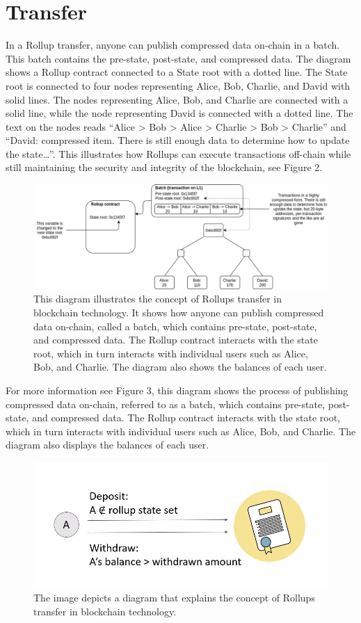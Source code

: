\documentclass{report}
\begin{document}
\section{Transfer}
In a Rollup transfer, anyone can publish compressed data on-chain in a batch. This batch contains the pre-state, post-state, and compressed data. The diagram shows a Rollup contract connected to a State root with a dotted line. The State root is connected to four nodes representing Alice, Bob, Charlie, and David with solid lines. The nodes representing Alice, Bob, and Charlie are connected with a solid line, while the node representing David is connected with a dotted line. The text on the nodes reads “Alice > Bob > Alice > Charlie > Bob > Charlie” and “David: compressed item. There is still enough data to determine how to update the state…”. This illustrates how Rollups can execute transactions off-chain while still maintaining the security and integrity of the blockchain, see Figure 2.
\begin{center}
	\begin{figure}
		\centering
		\includegraphics[width=0.8\linewidth]{Fig/F2}
		\caption{This diagram illustrates the concept of Rollups transfer in blockchain technology. It shows how anyone can publish compressed data on-chain, called a batch, which contains pre-state, post-state, and compressed data. The Rollup contract interacts with the state root, which in turn interacts with individual users such as Alice, Bob, and Charlie. The diagram also shows the balances of each user.
		}
		\label{fig:f1}
	\end{figure}
\end{center}
For more information see Figure 3, this diagram shows the process of publishing compressed data on-chain, referred to as a batch, which contains pre-state, post-state, and compressed data. The Rollup contract interacts with the state root, which in turn interacts with individual users such as Alice, Bob, and Charlie. The diagram also displays the balances of each user.
\begin{center}
	\begin{figure}
		\centering
		\includegraphics[width=0.8\linewidth]{Fig/F3}
		\caption{The image depicts a diagram that explains the concept of Rollups transfer in blockchain technology.
		}
		\label{fig:f1}
	\end{figure}
\end{center}
\end{document}
